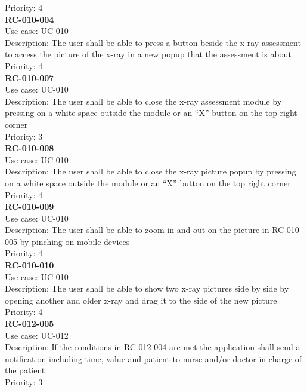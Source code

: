 Priority: 4 \\
\newline
\textbf{RC-010-004} \\
Use case: UC-010 \\
Description: The user shall be able to press a button beside the x-ray assessment to access the picture of the x-ray in a new popup that the assessment is about \\
Priority: 4 \\
\newline
\textbf{RC-010-007} \\
Use case: UC-010 \\
Description: The user shall be able to close the x-ray assessment module by pressing on a white space outside the module or an “X” button on the top right corner \\
Priority: 3 \\
\newline
\textbf{RC-010-008} \\
Use case: UC-010 \\
Description: The user shall be able to close the x-ray picture popup by pressing on a white space outside the module or an “X” button on the top right corner \\
Priority: 4 \\
\newline
\textbf{RC-010-009} \\
Use case: UC-010 \\
Description: The user shall be able to zoom in and out on the picture in RC-010-005 by pinching on mobile devices \\
Priority: 4 \\
\newline
\textbf{RC-010-010} \\
Use case: UC-010 \\
Description: The user shall be able to show two x-ray pictures side by side by opening another and older x-ray and drag it to the side of the new picture \\
Priority: 4 \\
\newline
\textbf{RC-012-005} \\
Use case: UC-012 \\
Description: If the conditions in RC-012-004 are met the application shall send a notification including time, value and patient to nurse and/or doctor in charge of the patient \\
Priority: 3 \\
